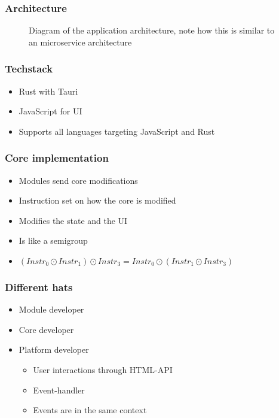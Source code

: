 \begin{frame}
  \frametitle{Architecture}
  \begin{figure}[H]
    \centering
    
    \caption{
      Diagram of the application architecture, note how this is similar to an
      microservice architecture
    }
  \end{figure}
\end{frame}

\begin{frame}
  \frametitle{Techstack}
  \begin{itemize}
    \item Rust with Tauri
    \item JavaScript for UI
    \item Supports all languages targeting JavaScript and Rust
  \end{itemize}
\end{frame}

\begin{frame}
  \frametitle{Core implementation}
  \begin{itemize}
    \item Modules send core modifications
    \item Instruction set on how the core is modified
    \item Modifies the state and the UI
    \item Is like a semigroup
    \item $(Instr_0 \odot Instr_1) \odot Instr_3 = Instr_0 \odot (Instr_1 \odot Instr_3)$
  \end{itemize}
\end{frame}

\begin{frame}
  \frametitle{Different hats}
  \begin{itemize}
    \item Module developer
    \item Core developer
    \item Platform developer
      \begin{itemize}
        \item User interactions through HTML-API
        \item Event-handler
        \item Events are in the same context
      \end{itemize}
  \end{itemize}
\end{frame}

